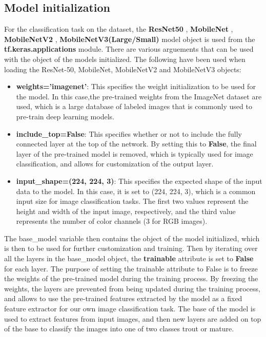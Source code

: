
\subsection{Model initialization}
For the classification task on the dataset, the \textbf{ResNet50} \cite{tensorflowTfkerasapplicationsresnet50ResNet50TensorFlow}, \textbf{MobileNet} \cite{tensorflowModuleTfkerasapplicationsmobilenet}, \textbf{MobileNetV2} \cite{tensorflowModuleTfkerasapplicationsmobilenet_v2}, \textbf{MobileNetV3(Large/Small)} \cite{tensorflowTfkerasapplicationsMobileNetV3LargeTensorFlow} \cite{tensorflowTfkerasapplicationsMobileNetV3SmallTensorFlow} model object is used from the \textbf{tf.keras.applications} module. There are various arguements that can be used with the object of the models initialized. The following have been used when loading the ResNet-50, MobileNet, MobileNetV2 and MobileNetV3 objects:
\begin{itemize}
    \item \textbf{weights='imagenet'}: This specifies the weight initialization to be used for the model. In this case,the pre-trained weights from the ImageNet dataset are used, which is a large database of labeled images that is commonly used to pre-train deep learning models.
    \item \textbf{include\_top=False}: This specifies whether or not to include the fully connected layer at the top of the network. By setting this to \textbf{False}, the final layer of the pre-trained model is removed, which is typically used for image classification, and allows for customization of the output layer.
    \item \textbf{input\_shape=(224, 224, 3)}: This specifies the expected shape of the input data to the model. In this case, it is set to (224, 224, 3), which is a common input size for image classification tasks. The first two values represent the height and width of the input image, respectively, and the third value represents the number of color channels (3 for RGB images).
\end{itemize}

The base\_model variable then contains the object of the model initialized, which is then to be used for further customization and training. Then by iterating over all the layers in the base\_model object, the \textbf{trainable} attribute is set to \textbf{False} for each layer. The purpose of setting the trainable attribute to False is to freeze the weights of the pre-trained model during the training process. By freezing the weights, the layers are prevented from being updated during the training process, and allows to use the pre-trained features extracted by the model as a fixed feature extractor for our own image classification task. The base of the model is used to extract features from input images, and then new layers are added on top of the base to classify the images into one of two classes trout or mature.\\



